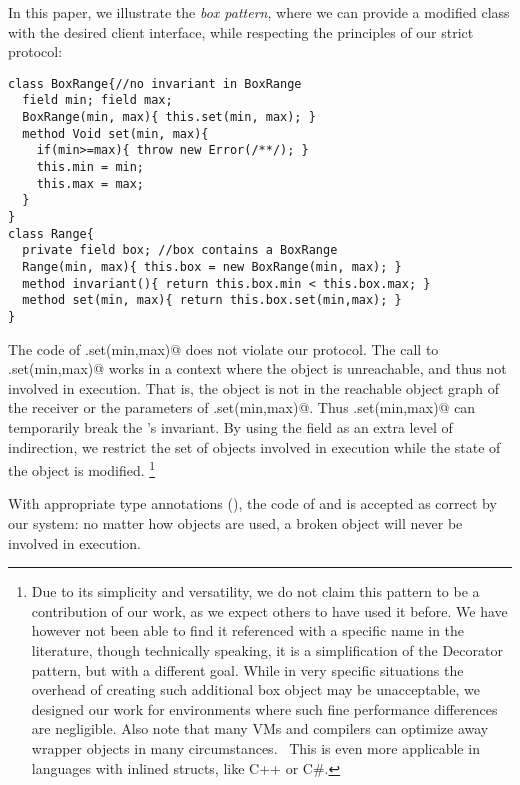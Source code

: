 In this paper, we illustrate the \emph{box pattern}, where we can provide a modified
\Q@Range@ class with the desired client interface, while respecting the principles of our strict protocol:
\begin{lstlisting}
class BoxRange{//no invariant in BoxRange
  field min; field max;
  BoxRange(min, max){ this.set(min, max); }
  method Void set(min, max){
    if(min>=max){ throw new Error(/**/); }
    this.min = min;
    this.max = max;
  }
}
class Range{
  private field box; //box contains a BoxRange
  Range(min, max){ this.box = new BoxRange(min, max); }
  method invariant(){ return this.box.min < this.box.max; }
  method set(min, max){ return this.box.set(min,max); }
}
\end{lstlisting}
The code of \Q@Range.set(min,max)@ does not violate our protocol.
The call to
\Q@BoxRange.set(min,max)@ works in a context where the \Q@Range@ object is
unreachable, and thus not involved in execution.
That is, the \Q@Range@ object is not in the reachable object graph of the receiver or the parameters of \Q@BoxRange.set(min,max)@.
 Thus \Q@Range.set(min,max)@ can temporarily break the \Q@Range@'s invariant.
By using the \Q@box@ field as an extra level of indirection, we restrict the set of objects involved in execution while the state of the object \Q@Range@ is modified. %
\footnote{Due to its simplicity and versatility, we do not claim this pattern to be a contribution of our work, as we expect others to have used it before. We have however not been able to find it referenced with a specific name in the literature, though technically speaking, it is a simplification of the Decorator pattern, but with a different goal.
While in very specific situations the overhead of creating such additional box object may be unacceptable, we designed our work for environments where such fine performance differences are negligible.
Also note that many VMs and compilers can optimize away wrapper objects in many circumstances.~\cite{Bolz:2011:ARP:1929501.1929508}
This is even more applicable in languages with inlined structs, like C++ or C\#.
}

With appropriate type annotations (), the code of \Q@Range@ and \Q@BoxRange@ is accepted as correct by our system: no matter how \Q@Range@ objects are used, a broken \Q@Range@ object will never be involved in execution. 

